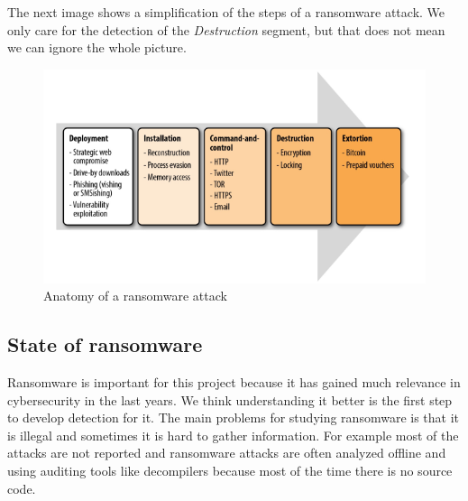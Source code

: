 \linej
\linej
The next image shows a simplification of the steps of a ransomware attack.
We only care for the detection of the \textit{Destruction} segment, but that does not mean we can ignore the whole picture.
\begin{figure}[H]
	\centering
	\includegraphics[width=\textwidth]{figuras/anatomy_of_a_ransomware_attack.png}
	\caption{Anatomy of a ransomware attack\cite{ransomware_oReilly}}
\end{figure}

\subsection{State of ransomware}
Ransomware is important for this project because it has gained much relevance in cybersecurity in the last years.
We think understanding it better is the first step to develop detection for it.
\linej
\linej
The main problems for studying ransomware is that it is illegal and sometimes it is hard to gather information.
For example most of the attacks are not reported and ransomware attacks are often analyzed offline and using auditing tools like decompilers because most of the time there is no source code\cite{ransomware_digital_extortion}.

